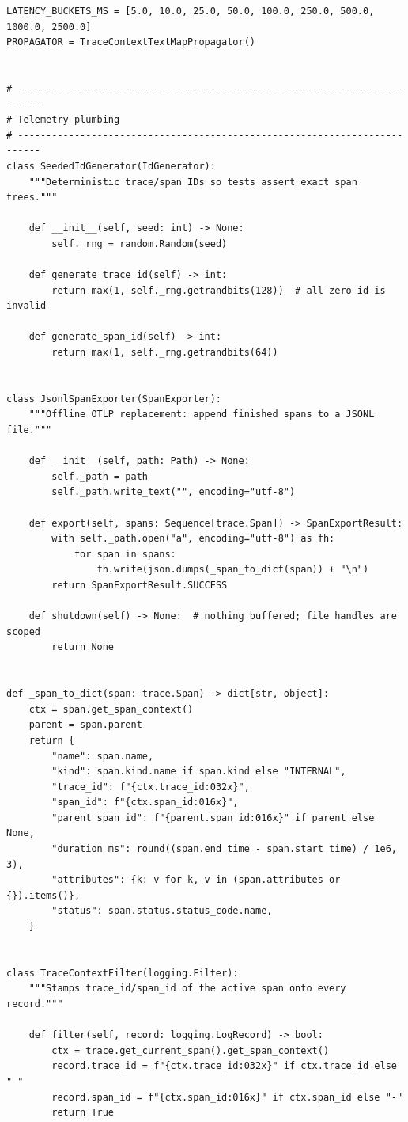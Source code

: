 \begin{verbatim}
LATENCY_BUCKETS_MS = [5.0, 10.0, 25.0, 50.0, 100.0, 250.0, 500.0, 1000.0, 2500.0]
PROPAGATOR = TraceContextTextMapPropagator()


# --------------------------------------------------------------------------
# Telemetry plumbing
# --------------------------------------------------------------------------
class SeededIdGenerator(IdGenerator):
    """Deterministic trace/span IDs so tests assert exact span trees."""

    def __init__(self, seed: int) -> None:
        self._rng = random.Random(seed)

    def generate_trace_id(self) -> int:
        return max(1, self._rng.getrandbits(128))  # all-zero id is invalid

    def generate_span_id(self) -> int:
        return max(1, self._rng.getrandbits(64))


class JsonlSpanExporter(SpanExporter):
    """Offline OTLP replacement: append finished spans to a JSONL file."""

    def __init__(self, path: Path) -> None:
        self._path = path
        self._path.write_text("", encoding="utf-8")

    def export(self, spans: Sequence[trace.Span]) -> SpanExportResult:
        with self._path.open("a", encoding="utf-8") as fh:
            for span in spans:
                fh.write(json.dumps(_span_to_dict(span)) + "\n")
        return SpanExportResult.SUCCESS

    def shutdown(self) -> None:  # nothing buffered; file handles are scoped
        return None


def _span_to_dict(span: trace.Span) -> dict[str, object]:
    ctx = span.get_span_context()
    parent = span.parent
    return {
        "name": span.name,
        "kind": span.kind.name if span.kind else "INTERNAL",
        "trace_id": f"{ctx.trace_id:032x}",
        "span_id": f"{ctx.span_id:016x}",
        "parent_span_id": f"{parent.span_id:016x}" if parent else None,
        "duration_ms": round((span.end_time - span.start_time) / 1e6, 3),
        "attributes": {k: v for k, v in (span.attributes or {}).items()},
        "status": span.status.status_code.name,
    }


class TraceContextFilter(logging.Filter):
    """Stamps trace_id/span_id of the active span onto every record."""

    def filter(self, record: logging.LogRecord) -> bool:
        ctx = trace.get_current_span().get_span_context()
        record.trace_id = f"{ctx.trace_id:032x}" if ctx.trace_id else "-"
        record.span_id = f"{ctx.span_id:016x}" if ctx.span_id else "-"
        return True



\end{verbatim}
